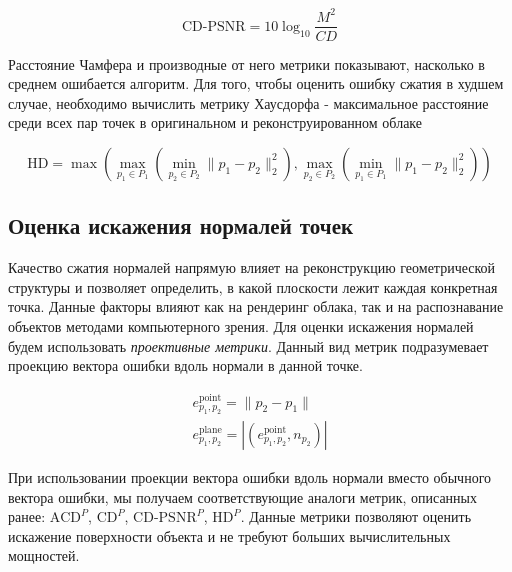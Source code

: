 \begin{equation} \label{eq:cd_psnr_chamfer}
    \text{CD-PSNR} = 10 \log_{10} \frac{M^{2}}{CD}
\end{equation}


Расстояние Чамфера и производные от него метрики показывают, насколько в среднем
ошибается алгоритм. Для того, чтобы оценить ошибку сжатия в худшем случае,
необходимо вычислить метрику Хаусдорфа - максимальное расстояние среди всех пар
точек в оригинальном и реконструированном облаке

\begin{equation} \label{eq:cloud_hausdorff}
    \text{HD} = \max \left(
        \max_{p_{1} \in P_{1}} \left(
            \min_{p_{2} \in P_{2}} \lVert p_{1} - p_{2} \rVert_{2}^{2}
         \right),
        \max_{p_{2} \in P_{2}} \left(
            \min_{p_{1} \in P_{1}} \lVert p_{1} - p_{2} \rVert_{2}^{2}
         \right)
    \right)
\end{equation}

\subsection{Оценка искажения нормалей точек}


Качество сжатия нормалей напрямую влияет на реконструкцию геометрической
структуры и позволяет определить, в какой плоскости лежит каждая конкретная
точка. Данные факторы влияют как на рендеринг облака, так и на распознавание
объектов методами компьютерного зрения. Для оценки искажения нормалей будем
использовать \textit{проективные метрики}\cite{PCQA}. Данный вид метрик
подразумевает проекцию вектора ошибки вдоль нормали в данной точке.

\begin{gather} \label{eq:point_to_plane_error}
    e_{p_{1}, p_{2}}^{\text{point}} = \lVert p_{2} - p_{1} \rVert \nonumber \\
    e_{p_{1}, p_{2}}^{\text{plane}} = \left|\left(
        e_{p_{1}, p_{2}}^{\text{point}}, n_{p_{2}}
    \right)\right|
\end{gather}

При использовании проекции вектора ошибки вдоль нормали вместо обычного вектора
ошибки, мы получаем соответствующие аналоги метрик, описанных ранее:
$\text{ACD}^{P}$, $\text{CD}^{P}$, $\text{CD-PSNR}^{P}$, $\text{HD}^{P}$. Данные
метрики позволяют оценить искажение поверхности объекта и не требуют больших
вычислительных мощностей.

